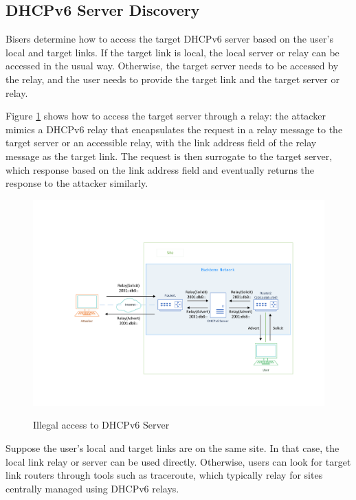 \documentclass[conference]{IEEEtran}
\begin{document}
\subsection{DHCPv6 Server Discovery}

Bisers determine how to access the target DHCPv6 server based on the
user's local and target links. If the target link is local, the local
server or relay can be accessed in the usual way. Otherwise, the
target server needs to be accessed by the relay, and the user needs to
provide the target link and the target server or relay.

Figure \ref{figRelay2} shows how to access the target server through a
relay: the attacker mimics a DHCPv6 relay that encapsulates the
request in a relay message to the target server or an accessible
relay, with the link address field of the relay message as the target
link. The request is then surrogate to the target server, which
response based on the link address field and eventually returns the
response to the attacker similarly.

\begin{figure}[htbp]
  \caption{Illegal access to DHCPv6 Server}
  \label{figRelay2}
  \centering
  \includegraphics[scale=0.35]{relay2.pdf} \\
\end{figure}

Suppose the user's local and target links are on the same site. In
that case, the local link relay or server can be used
directly. Otherwise, users can look for target link routers through
tools such as traceroute, which typically relay for sites centrally
managed using DHCPv6 relays.
\end{document}
